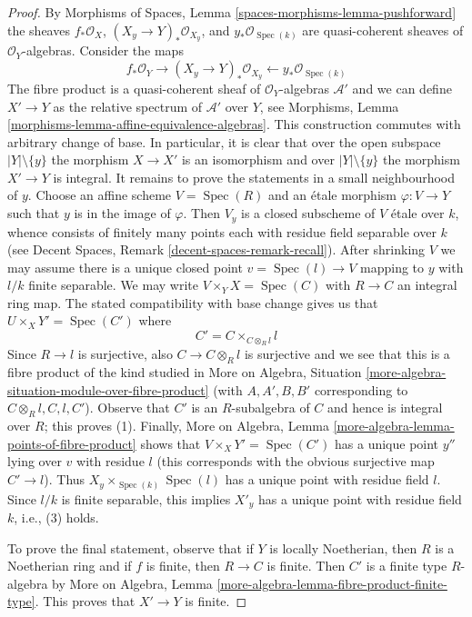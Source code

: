 \documentclass[10pt,a4paper]{amsart}
\theoremstyle{plain}
\theoremstyle{definition}
\theoremstyle{remark}
\numberwithin{equation}{subsection}
\def\Spec{\mathop{\mathrm{Spec}}}
\begin{document}
\begin{proof}
By Morphisms of Spaces, Lemma \ref{spaces-morphisms-lemma-pushforward}
the sheaves $f_*\mathcal{O}_X$, $(X_y \to Y)_*\mathcal{O}_{X_y}$, and
$y_*\mathcal{O}_{\Spec(k)}$ are quasi-coherent sheaves of
$\mathcal{O}_Y$-algebras. Consider the maps
$$
f_*\mathcal{O}_Y \longrightarrow
(X_y \to Y)_*\mathcal{O}_{X_y} \longleftarrow
y_*\mathcal{O}_{\Spec(k)}
$$
The fibre product is a quasi-coherent sheaf of $\mathcal{O}_Y$-algebras
$\mathcal{A}'$ and we can define $X' \to Y$ as the relative spectrum
of $\mathcal{A}'$ over $Y$, see
Morphisms, Lemma \ref{morphisms-lemma-affine-equivalence-algebras}.
This construction commutes with arbitrary change of base.
In particular, it is clear that over the open subspace
$|Y| \setminus \{y\}$ the morphism $X \to X'$ is an isomorphism
and over $|Y| \setminus \{y\}$ the morphism $X' \to Y$ is integral.
It remains to prove the statements in a small neighbourhood of $y$.
Choose an affine scheme $V = \Spec(R)$ and an \'etale
morphism $\varphi : V \to Y$ such that $y$ is in the image of
$\varphi$. Then $V_y$ is a closed subscheme of $V$
\'etale over $k$, whence consists of finitely many points
each with residue field separable over $k$
(see Decent Spaces, Remark \ref{decent-spaces-remark-recall}).
After shrinking $V$
we may assume there is a unique closed point $v = \Spec(l) \to V$
mapping to $y$ with $l/k$ finite separable.
We may write $V \times_Y X = \Spec(C)$ with $R \to C$
an integral ring map. The stated compatibility with
base change gives us that $U \times_X Y' = \Spec(C')$ where
$$
C' = C \times_{C \otimes_R l} l
$$
Since $R \to l$ is surjective, also $C \to C \otimes_R l$
is surjective and we see that this is a fibre product of the
kind studied in More on Algebra, Situation
\ref{more-algebra-situation-module-over-fibre-product}
(with $A, A', B, B'$ corresponding to $C \otimes_R l, C, l, C'$).
Observe that $C'$ is an $R$-subalgebra of $C$ and hence
is integral over $R$; this proves (1).
Finally, More on Algebra, Lemma
\ref{more-algebra-lemma-points-of-fibre-product}
shows that $V \times_X Y' = \Spec(C')$
has a unique point $y''$ lying over $v$ with residue $l$
(this corresponds with the obvious surjective map $C' \to l$).
Thus $X_y \times_{\Spec(k)} \Spec(l)$ has a unique point
with residue field $l$. Since $l/k$ is finite separable,
this implies $X'_y$ has a unique point with residue field $k$, i.e.,
(3) holds.

\medskip\noindent
To prove the final statement, observe that if $Y$ is locally Noetherian,
then $R$ is a Noetherian ring and if $f$ is finite, then $R \to C$ is
finite. Then $C'$ is a finite type $R$-algebra by More on Algebra,
Lemma \ref{more-algebra-lemma-fibre-product-finite-type}.
This proves that $X' \to Y$ is finite.
\end{proof}
\end{document}
